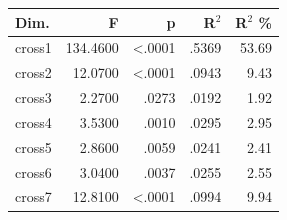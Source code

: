 \begin{table}
\begin{tabular}{lrrrr}
\toprule
Dim. & F & p & R$^2$ & R$^2$ \% \\
\midrule
cross1 & 134.4600 & <.0001 & .5369 & 53.69 \\
cross2 & 12.0700 & <.0001 & .0943 & 9.43 \\
cross3 & 2.2700 & .0273 & .0192 & 1.92 \\
cross4 & 3.5300 & .0010 & .0295 & 2.95 \\
cross5 & 2.8600 & .0059 & .0241 & 2.41 \\
cross6 & 3.0400 & .0037 & .0255 & 2.55 \\
cross7 & 12.8100 & <.0001 & .0994 & 9.94 \\
\bottomrule
\end{tabular}
\end{table}

